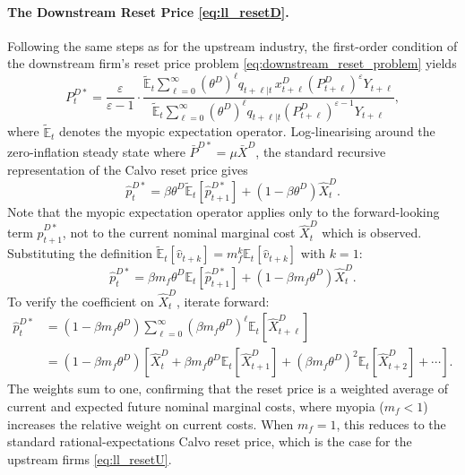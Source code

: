 \documentclass[a4paper, 12pt]{article}
\newcommand{\E}{\mathbb{E}}
\theoremstyle{definition*}
\begin{document}
\paragraph{The Downstream Reset Price \eqref{eq:ll_resetD}.}
Following the same steps as for the upstream industry, the first-order condition of the downstream firm's reset price problem \eqref{eq:downstream_reset_problem} yields
\begin{equation*}
    P^{D*}_t = \frac{\varepsilon}{\varepsilon - 1} \cdot \frac{\tilde{\E}_t \sum_{\ell=0}^{\infty} (\theta^D)^\ell q_{t+\ell|t} \, x^D_{t+\ell} (P^D_{t+\ell})^{\varepsilon} Y_{t+\ell}}{\tilde{\E}_t \sum_{\ell=0}^{\infty} (\theta^D)^\ell q_{t+\ell|t} (P^D_{t+\ell})^{\varepsilon-1} Y_{t+\ell}},
\end{equation*}
where $\tilde{\E}_t$ denotes the myopic expectation operator.
Log-linearising around the zero-inflation steady state where $\bar{P}^{D*} = \mu \bar{X}^D$, the standard recursive representation of the Calvo reset price gives
\begin{equation*}
    \hat{p}^{D*}_t = \beta \theta^D \tilde{\E}_t[\hat{p}^{D*}_{t+1}] + (1 - \beta\theta^D)\hat{X}^D_t.
\end{equation*}
Note that the myopic expectation operator applies only to the forward-looking term $\hat{p}^{D*}_{t+1}$, not to the current nominal marginal cost $\hat{X}^D_t$ which is observed. Substituting the definition $\tilde{\E}_t[\hat{v}_{t+k}] = m_f^k \E_t[\hat{v}_{t+k}]$ with $k = 1$:
\begin{equation*}
    \hat{p}^{D*}_t = \beta m_f \theta^D \E_t[\hat{p}^{D*}_{t+1}] + (1 - \beta m_f \theta^D)\hat{X}^D_t.
\end{equation*}
To verify the coefficient on $\hat{X}^D_t$, iterate forward:
\begin{align*}
    \hat{p}^{D*}_t &= (1 - \beta m_f \theta^D) \sum_{\ell=0}^{\infty} (\beta m_f \theta^D)^\ell \E_t[\hat{X}^D_{t+\ell}] \\
    &= (1 - \beta m_f \theta^D) \left[\hat{X}^D_t + \beta m_f \theta^D \E_t[\hat{X}^D_{t+1}] + (\beta m_f \theta^D)^2 \E_t[\hat{X}^D_{t+2}] + \cdots \right].
\end{align*}
The weights sum to one, confirming that the reset price is a weighted average of current and expected future nominal marginal costs, where myopia ($m_f < 1$) increases the relative weight on current costs.
When $m_f = 1$, this reduces to the standard rational-expectations Calvo reset price, which is the case for the upstream firms \eqref{eq:ll_resetU}.
\end{document}

